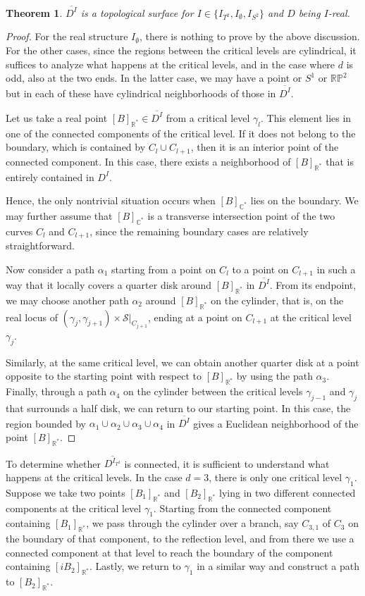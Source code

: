 \documentclass[pdflatex,sn-mathphys-num]{sn-jnl}%
\theoremstyle{thmstyleone}%
\newtheorem{theorem}{Theorem}
\theoremstyle{thmstyletwo}%
\theoremstyle{thmstylethree}%
\newcommand{\R}{\mathbb{R}}
\newcommand{\RP}{\mathbb{R}\mathbb{P}}
\newcommand{\C}{\mathbb{C}}
\begin{document}
\begin{theorem}
	$\overline{D^{I}}$ is a topological surface for $I\in\{I_{T^2},I_\emptyset,I_{S^2}\}$ and $D$ being $I$-real.
\end{theorem}
\begin{proof}
For the real structure $I_{\emptyset}$, there is nothing to prove by the above discussion. For the other cases, since the regions between the critical levels are cylindrical, it suffices to analyze what happens at the critical levels, and in the case where $d$ is odd, also at the two ends. In the latter case, we may have a point or $S^1$ or $\RP^2$ but in each of these have cylindrical neighborhoods of those in $\overline{D^I}$.


Let us take a real point $[B]_{\R^*}\in\overline{D^I}$ from a critical level $\gamma_l$. This element lies in one of the connected components of the critical level. If it does not belong to the boundary, which is contained by $C_l\cup C_{l+1}$, then it is an interior point of the connected component. In this case, there exists a neighborhood of $[B]_{\R^*}$ that is entirely contained in $D^{I}$.

Hence, the only nontrivial situation occurs when $[B]_{\C^*}$ lies on the boundary. We may further assume that $[B]_{\C^*}$ is a transverse intersection point of the two curves $C_l$ and $C_{l+1}$, since the remaining boundary cases are relatively straightforward.

Now consider a path $\alpha_1$ starting from a point on $C_l$ to a point on $C_{l+1}$ in such a way that it locally covers a quarter disk around $[B]_{\mathbb{R}^*}$ in $\overline{D^I}$. From its endpoint, we may choose another path $\alpha_2$ around $[B]_{\mathbb{R}^*}$ on the cylinder, that is, on the real locus of $(\gamma_j,\gamma_{j+1}) \times \mathcal{S}\big|_{C_{j+1}}$, ending at a point on $C_{l+1}$ at the critical level $\gamma_j$.

Similarly, at the same critical level, we can obtain another quarter disk at a point opposite to the starting point with respect to $[B]_{\R^*}$ by using the path $\alpha_3$. Finally, through a path $\alpha_4$ on the cylinder between the critical levels $\gamma_{j-1}$ and $\gamma_j$ that surrounds a half disk, we can return to our starting point. In this case, the region bounded by $\alpha_1 \cup \alpha_2 \cup \alpha_3 \cup \alpha_4$ in $\overline{D^I}$ gives a Euclidean neighborhood of the point $[B]_{\R^*}$.
\end{proof}
To determine whether $\overline{D^{I_{T^2}}}$ is connected, it is sufficient to understand what happens at the critical levels. In the case $d = 3$, there is only one critical level $\gamma_1$. Suppose we take two points $[B_1]_{\R^*}$ and $[B_2]_{\R^*}$ lying in two different connected components at the critical level $\gamma_1$. Starting from the connected component containing $[B_1]_{\R^*}$, we pass through the cylinder over a branch, say $C_{3,1}$ of $C_3$ on the boundary of that component, to the reflection level, and from there we use a connected component at that level to reach the boundary of the component containing $[iB_2]_{\R^*}$. Lastly, we return to $\gamma_1$ in a similar way and construct a path to $[B_2]_{\R^*}$. 
\end{document}
